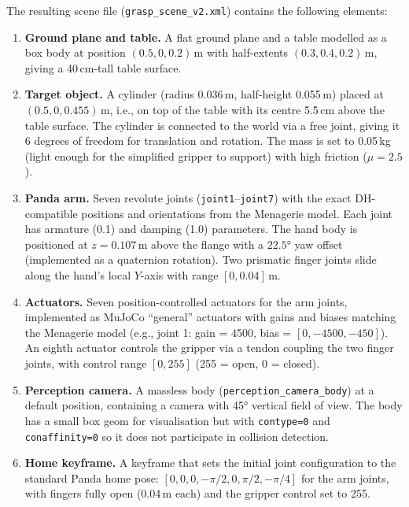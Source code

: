 \documentclass[11pt,a4paper]{report}
\begin{document}
The resulting scene file (\texttt{grasp\_scene\_v2.xml}) contains the following elements:

\begin{enumerate}
  \item \textbf{Ground plane and table.} A flat ground plane and a table modelled as a box body at position $(0.5, 0, 0.2)$\,m with half-extents $(0.3, 0.4, 0.2)$\,m, giving a 40\,cm-tall table surface.

  \item \textbf{Target object.} A cylinder (radius 0.036\,m, half-height 0.055\,m) placed at $(0.5, 0, 0.455)$\,m, i.e., on top of the table with its centre 5.5\,cm above the table surface. The cylinder is connected to the world via a free joint, giving it 6 degrees of freedom for translation and rotation. The mass is set to 0.05\,kg (light enough for the simplified gripper to support) with high friction ($\mu = 2.5$).

  \item \textbf{Panda arm.} Seven revolute joints (\texttt{joint1}--\texttt{joint7}) with the exact DH-compatible positions and orientations from the Menagerie model. Each joint has armature (0.1) and damping (1.0) parameters. The hand body is positioned at $z = 0.107$\,m above the flange with a $22.5°$ yaw offset (implemented as a quaternion rotation). Two prismatic finger joints slide along the hand's local $Y$-axis with range $[0, 0.04]$\,m.

  \item \textbf{Actuators.} Seven position-controlled actuators for the arm joints, implemented as MuJoCo ``general'' actuators with gains and biases matching the Menagerie model (e.g., joint 1: gain = 4500, bias = $[0, -4500, -450]$). An eighth actuator controls the gripper via a tendon coupling the two finger joints, with control range $[0, 255]$ (255 = open, 0 = closed).

  \item \textbf{Perception camera.} A massless body (\texttt{perception\_camera\_body}) at a default position, containing a camera with 45° vertical field of view. The body has a small box geom for visualisation but with \texttt{contype=0} and \texttt{conaffinity=0} so it does not participate in collision detection.

  \item \textbf{Home keyframe.} A keyframe that sets the initial joint configuration to the standard Panda home pose: $[0, 0, 0, -\pi/2, 0, \pi/2, -\pi/4]$ for the arm joints, with fingers fully open (0.04\,m each) and the gripper control set to 255.
\end{enumerate}
\end{document}
